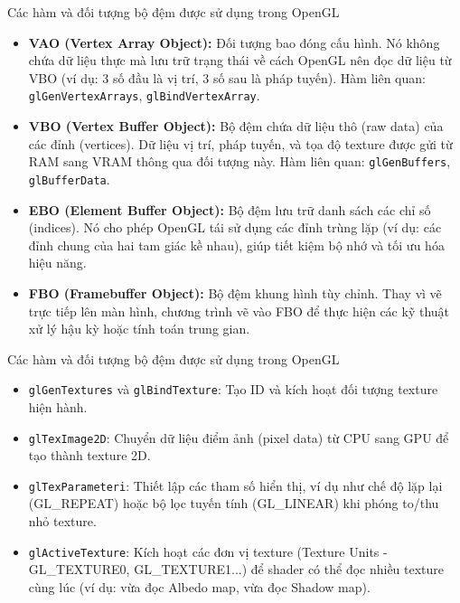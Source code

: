 \documentclass[11pt, aspectratio=169]{beamer}
\begin{document}
\begin{frame}{Các hàm và đối tượng bộ đệm được sử dụng trong OpenGL}
	\begin{itemize}
		\item \textbf{VAO (Vertex Array Object):} Đối tượng bao đóng cấu hình. Nó không chứa dữ liệu thực mà lưu trữ trạng thái về cách OpenGL nên đọc dữ liệu từ VBO (ví dụ: 3 số đầu là vị trí, 3 số sau là pháp tuyến). Hàm liên quan: \texttt{glGenVertexArrays}, \texttt{glBindVertexArray}.
		\item \textbf{VBO (Vertex Buffer Object):} Bộ đệm chứa dữ liệu thô (raw data) của các đỉnh (vertices). Dữ liệu vị trí, pháp tuyến, và tọa độ texture được gửi từ RAM sang VRAM thông qua đối tượng này. Hàm liên quan: \texttt{glGenBuffers}, \texttt{glBufferData}.
		\item \textbf{EBO (Element Buffer Object):} Bộ đệm lưu trữ danh sách các chỉ số (indices). Nó cho phép OpenGL tái sử dụng các đỉnh trùng lặp (ví dụ: các đỉnh chung của hai tam giác kề nhau), giúp tiết kiệm bộ nhớ và tối ưu hóa hiệu năng.
		\item \textbf{FBO (Framebuffer Object):} Bộ đệm khung hình tùy chỉnh. Thay vì vẽ trực tiếp lên màn hình, chương trình vẽ vào FBO để thực hiện các kỹ thuật xử lý hậu kỳ hoặc tính toán trung gian.
	\end{itemize}
\end{frame}

\begin{frame}{Các hàm và đối tượng bộ đệm được sử dụng trong OpenGL}
	\begin{itemize}
		\item \texttt{glGenTextures} và \texttt{glBindTexture}: Tạo ID và kích hoạt đối tượng texture hiện hành.
		\item \texttt{glTexImage2D}: Chuyển dữ liệu điểm ảnh (pixel data) từ CPU sang GPU để tạo thành texture 2D.
		\item \texttt{glTexParameteri}: Thiết lập các tham số hiển thị, ví dụ như chế độ lặp lại (GL\_REPEAT) hoặc bộ lọc tuyến tính (GL\_LINEAR) khi phóng to/thu nhỏ texture.
		\item \texttt{glActiveTexture}: Kích hoạt các đơn vị texture (Texture Units -\\ GL\_TEXTURE0, GL\_TEXTURE1...) để shader có thể đọc nhiều texture cùng lúc (ví dụ: vừa đọc Albedo map, vừa đọc Shadow map).
	\end{itemize}
\end{frame}
\end{document}
